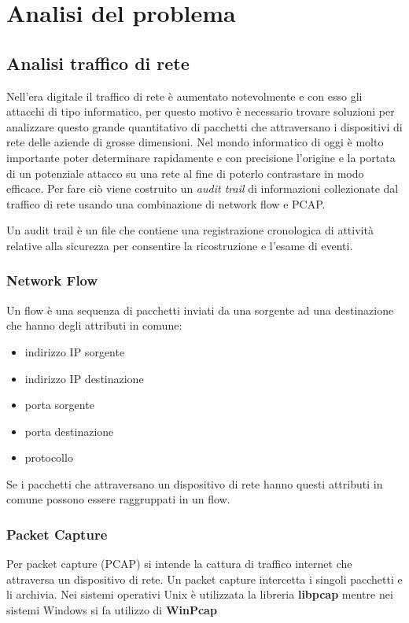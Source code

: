 \documentclass[../main.tex]{subfiles}
\begin{document}
\chapter{Analisi del problema}

\section{Analisi traffico di rete}

Nell'era digitale il traffico di rete è aumentato notevolmente e con esso gli attacchi di tipo informatico, per questo motivo è necessario trovare soluzioni per analizzare questo grande quantitativo di pacchetti che attraversano i dispositivi di rete delle aziende di grosse dimensioni. Nel mondo informatico di oggi è molto importante poter determinare rapidamente e con precisione l'origine e la portata di un potenziale attacco su una rete al fine di poterlo contrastare in modo efficace.
Per fare ciò viene costruito un \textit{audit trail} di informazioni collezionate dal traffico di rete usando una combinazione di network flow e PCAP. 

Un audit trail è un file che contiene una registrazione cronologica di attività relative alla sicurezza per consentire la ricostruzione e l'esame di eventi.

\subsection{Network Flow}
Un flow è una sequenza di pacchetti inviati da una sorgente ad una destinazione che hanno degli attributi in comune:
\begin{itemize}
				\item indirizzo IP sorgente
				\item indirizzo IP destinazione
				\item porta sorgente
				\item porta destinazione
				\item protocollo
\end{itemize}

Se i pacchetti che attraversano un dispositivo di rete hanno questi attributi in comune possono essere raggruppati in un flow.

\subsection{Packet Capture}
Per packet capture (PCAP) si intende la cattura di traffico internet che attraversa un dispositivo di rete. Un packet capture intercetta i singoli pacchetti e li archivia. Nei sistemi operativi Unix è utilizzata la libreria \textbf{libpcap} mentre nei sistemi Windows si fa utilizzo di \textbf{WinPcap}
\end{document}

